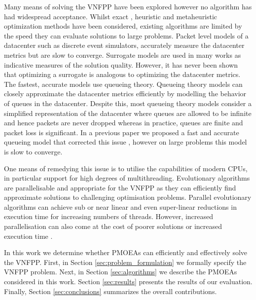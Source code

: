 Many means of solving the VNFPP have been explored however no algorithm has had widespread acceptance. Whilst exact \cite{BariCAB15,BaumgartnerRB15,MiottoLCG19}, heuristic \cite{GuoWLQA0Y20,QiSW19,QuASK17} and metaheuristic \cite{BillingsleyLMMG19,RankothgeMLRL15,SoualahMGZ17} optimization methods have been considered, existing algorithms are limited by the speed they can evaluate solutions to large problems. Packet level models of a datacenter such as discrete event simulators, accurately measure the datacenter metrics \cite{Pongor93} but are slow to converge. Surrogate models are used in many works \cite{AlameddineQA17,GuoWLQA0Y20,KuoLLT18,QiSW19,QuASK17,RankothgeLRL17,VizarretaCMMK17} as indicative measures of the solution quality. However, it has never been shown that optimizing a surrogate is analogous to optimizing the datacenter metrics. The fastest, accurate models use queueing theory. Queueing theory models can closely approximate the datacenter metrics efficiently by modelling the behavior of queues in the datacenter. Despite this, most queueing theory models consider a simplified representation of the datacenter where queues are allowed to be infinite and hence packets are never dropped \cite{AgarwalMCD18,GouarebFA18,OljiraGTB17} whereas in practice, queues are finite and packet loss is significant. In a previous paper we proposed a fast and accurate queueing model that corrected this issue \cite{BillingsleyLMMG20}, however on large problems this model is slow to converge.

One means of remedying this issue is to utilise the capabilities of modern CPUs, in particular support for high degrees of multithreading. Evolutionary algorithms are parallelisable and appropriate for the VNFPP as they can efficiently find approximate solutions to challenging optimisation problems. Parallel evolutionary algorithms can achieve sub or near linear \cite{BrankeSDM04,El-AlfyA16,LuckenBS04,LuoFBP19,ShiZS20,ZhangYCJ20} and even super-linear \cite{Alba02,MuhlenbeinSB91} reductions in execution time for increasing numbers of threads. However, increased parallelisation can also come at the cost of poorer solutions \cite{BrankeSDM04} or increased execution time \cite{El-AlfyA16}.

In this work we determine whether PMOEAs can efficiently and effectively solve the VNFPP. First, in Section \ref{sec:problem_formulation} we formally specify the VNFPP problem. Next, in Section \ref{sec:algorithms} we describe the PMOEAs considered in this work. Section \ref{sec:results} presents the results of our evaluation. Finally, Section \ref{sec:conclusions} summarizes the overall contributions.